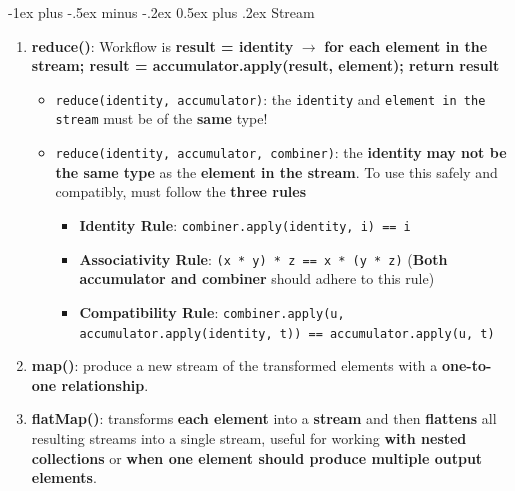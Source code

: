 \documentclass[10pt, landscape]{article}
\makeatletter
\renewcommand{\section}{\@startsection{section}{1}{0mm}%
                                {-1ex plus -.5ex minus -.2ex}%
                                {0.5ex plus .2ex}%
                                {\normalfont\large\bfseries}}
\makeatother
\begin{document}
\begin{multicols}{4}
\section{Stream}
\begin{enumerate}
    \item \textbf{reduce()}: Workflow is \textbf{result = identity} $\rightarrow$ \textbf{for each element in the stream; result = accumulator.apply(result, element); return result}
    \begin{itemize}
        \item \texttt{reduce(identity, accumulator)}: the \texttt{identity} and \texttt{element in the stream} must be of the \textbf{same} type!
        \item \texttt{reduce(identity, accumulator, combiner)}: the \textbf{identity} \textbf{may not be the same type} as the \textbf{element in the stream}. To use this safely and compatibly, must follow the \textbf{three rules}
        \begin{itemize}
            \item \textbf{Identity Rule}: \texttt{combiner.apply(identity, i) == i}
            \item \textbf{Associativity Rule}: \texttt{(x * y) * z == x * (y * z)} (\textbf{Both accumulator and combiner} should adhere to this rule)
            \item \textbf{Compatibility Rule}: \texttt{combiner.apply(u, accumulator.apply(identity, t)) == accumulator.apply(u, t)}
        \end{itemize}
    \end{itemize}
    \item \textbf{map()}: produce a new stream of the transformed elements with a \textbf{one-to-one relationship}. %
    \item \textbf{flatMap()}: transforms \textbf{each element} into a \textbf{stream} and then \textbf{flattens} all resulting streams into a single stream, useful for working \textbf{with nested collections} or \textbf{when one element should produce multiple output elements}. %

\end{enumerate}
\end{multicols}
\end{document}
